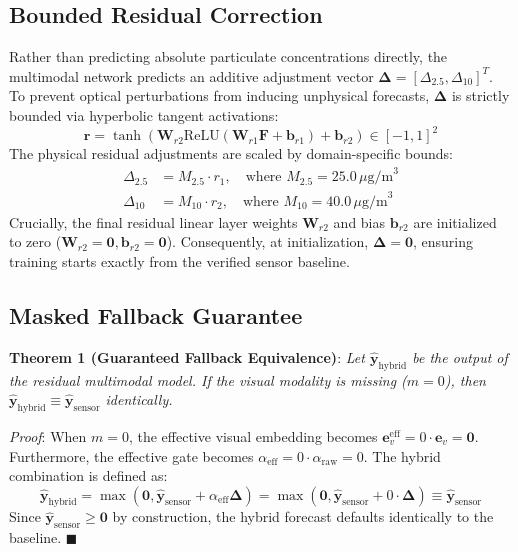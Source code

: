 \documentclass[conference]{IEEEtran}
\begin{document}
\subsection{Bounded Residual Correction}
Rather than predicting absolute particulate concentrations directly, the multimodal network predicts an additive adjustment vector $\boldsymbol{\Delta} = [\Delta_{2.5}, \Delta_{10}]^T$. To prevent optical perturbations from inducing unphysical forecasts, $\boldsymbol{\Delta}$ is strictly bounded via hyperbolic tangent activations:
\begin{equation}
\mathbf{r} = \tanh\left(\mathbf{W}_{r2} \text{ReLU}(\mathbf{W}_{r1} \mathbf{F} + \mathbf{b}_{r1}) + \mathbf{b}_{r2}\right) \in [-1, 1]^2
\end{equation}
The physical residual adjustments are scaled by domain-specific bounds:
\begin{align}
\Delta_{2.5} &= M_{2.5} \cdot r_1, \quad \text{where } M_{2.5} = 25.0\,\mu\text{g/m}^3 \\
\Delta_{10} &= M_{10} \cdot r_2, \quad \text{where } M_{10} = 40.0\,\mu\text{g/m}^3
\end{align}
Crucially, the final residual linear layer weights $\mathbf{W}_{r2}$ and bias $\mathbf{b}_{r2}$ are initialized to zero ($\mathbf{W}_{r2} = \mathbf{0}, \mathbf{b}_{r2} = \mathbf{0}$). Consequently, at initialization, $\boldsymbol{\Delta} = \mathbf{0}$, ensuring training starts exactly from the verified sensor baseline.

\subsection{Masked Fallback Guarantee}
\textbf{Theorem 1 (Guaranteed Fallback Equivalence)}: \textit{Let $\hat{\mathbf{y}}_{\text{hybrid}}$ be the output of the residual multimodal model. If the visual modality is missing ($m = 0$), then $\hat{\mathbf{y}}_{\text{hybrid}} \equiv \hat{\mathbf{y}}_{\text{sensor}}$ identically.}

\textit{Proof}: When $m = 0$, the effective visual embedding becomes $\mathbf{e}_v^{\text{eff}} = 0 \cdot \mathbf{e}_v = \mathbf{0}$. Furthermore, the effective gate becomes $\alpha_{\text{eff}} = 0 \cdot \alpha_{\text{raw}} = 0$. The hybrid combination is defined as:
\begin{equation}
\hat{\mathbf{y}}_{\text{hybrid}} = \max\left(\mathbf{0}, \hat{\mathbf{y}}_{\text{sensor}} + \alpha_{\text{eff}} \boldsymbol{\Delta}\right) = \max\left(\mathbf{0}, \hat{\mathbf{y}}_{\text{sensor}} + 0 \cdot \boldsymbol{\Delta}\right) \equiv \hat{\mathbf{y}}_{\text{sensor}}
\end{equation}
Since $\hat{\mathbf{y}}_{\text{sensor}} \ge \mathbf{0}$ by construction, the hybrid forecast defaults identically to the baseline. $\blacksquare$
\end{document}
